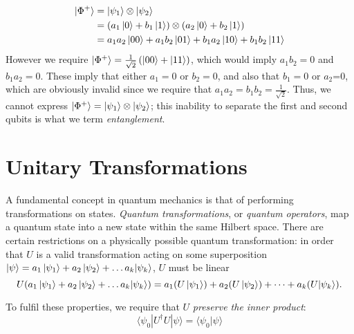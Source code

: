 \begin{equation}
    \begin{split}
        \ket{\Phi^{+}} &= \ket{\psi_1} \otimes \ket{\psi_2} 
        \\ &=  \left( a_1 \ket{0} + b_1 \ket{1} \right) \otimes \left( a_2 \ket{0} + b_2 \ket{1} \right)
        \\ &= a_1a_2 \ket{00} + a_1b_2 \ket{01} + b_1a_2 \ket{10} + b_1b_2\ket{11} 
    \end{split}
\end{equation}
However we require $\ket{\Phi^{+}} = \frac{1}{\sqrt{2}} \left( \ket{00} + \ket{11} \right) $, 
    which would imply $a_1b_2 = 0$ and $b_1a_2 = 0$. 
These imply that either $a_1 =0$ or $b_2=0$, and also that $b_1=0$ or $a_2$=0, which are obviously invalid since we require that $a_1a_2 = b_1b_2 = \frac{1}{\sqrt{2}} $. 
Thus, we cannot express $ |\Phi^+ \rangle=  \ket{\psi_1} \otimes \ket{\psi_2} $;
    this inability to separate the first and second qubits is what we term \emph{entanglement}. 

\section{Unitary Transformations}\label{sec:unitary}
A fundamental concept in quantum mechanics is that of performing transformations on states. 
\emph{Quantum transformations}, or \emph{quantum operators}, map a quantum state into a new state within the same Hilbert space. 
There are certain restrictions on a physically possible quantum transformation: in order that $U$ is a valid transformation acting on some superposition $\ket{\psi} = a_1\ket{\psi_1} + a_2 \ket{\psi_2} + \dots a_k|\psi_k\rangle $, $U$ must be linear 
\begin{equation}
    U (  a_1\ket{\psi_1} + a_2 \ket{\psi_2} + \dots a_k|\psi_k\rangle ) =  a_1 (U\ket{\psi_1}) + a_2 (U\ket{\psi_2}) + \dots + a_k (U|\psi_k\rangle).
\end{equation}


To fulfil these properties, we require that $U$ \emph{preserve the inner product}:
$$ \langle \psi_0 | U^{\dag}U | \psi \rangle = \langle \psi_0 | \psi \rangle $$

